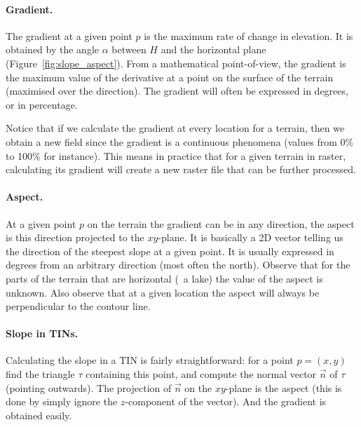 \paragraph{Gradient.} 
The gradient at a given point $p$ is the maximum rate of change in elevation. 
It is obtained by the angle $\alpha$ between $H$ and the horizontal plane (Figure~\ref{fig:slope_aspect}).
From a mathematical point-of-view, the gradient is the maximum value of the derivative at a point on the surface of the terrain (maximised over the direction).
The gradient will often be expressed in degrees, or in percentage.

Notice that if we calculate the gradient at every location for a terrain, then we obtain a new field since the gradient is a continuous phenomena (values from 0\% to 100\% for instance).
This means in practice that for a given terrain in raster, calculating its gradient will create a new raster file that can be further processed.


\paragraph{Aspect.}
At a given point $p$ on the terrain the gradient can be in any direction, the aspect is this direction projected to the $xy$-plane. 
It is basically a 2D vector telling us the direction of the steepest slope at a given point.
It is usually expressed in degrees from an arbitrary direction (most often the north).
Observe that for the parts of the terrain that are horizontal (\eg\ a lake) the value of the aspect is unknown.
Also observe that at a given location the aspect will always be perpendicular to the contour line.





\paragraph{Slope in TINs.}

Calculating the slope in a TIN is fairly straightforward: for a point $p=(x,y)$ find the triangle $\tau$ containing this point, and compute the normal vector $\vec{n}$ of $\tau$ (pointing outwards). 
The projection of $\vec{n}$ on the $xy$-plane is the aspect (this is done by simply ignore the $z$-component of the vector).
And the gradient is obtained easily.

